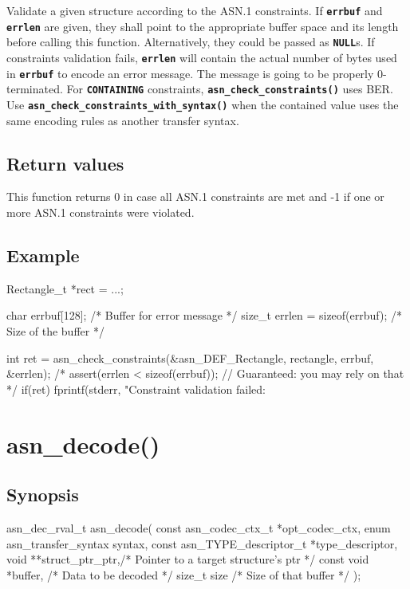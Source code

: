 \documentclass[english,oneside,12pt]{book}
\newcommand{\apisection}[2]{\clearpage\section{\label{#1}#2}}
\newcommand{\code}[1]{\texttt{\textbf{\lstinline{#1}}}}
\begin{document}
Validate a given structure according to the ASN.1 constraints.
If \code{errbuf} and \code{errlen} are given, they shall point to the
appropriate buffer space and its length before calling this function.
Alternatively, they could be passed as \code{NULL}s.
If constraints validation fails, \code{errlen} will contain the actual
number of bytes used in \code{errbuf} to encode an error message.
The message is going to be properly 0-terminated.
For \code{CONTAINING} constraints, \code{asn_check_constraints()} uses BER.
Use \code{asn_check_constraints_with_syntax()} when the contained value uses
the same encoding rules as another transfer syntax.

\subsection*{Return values}

This function returns 0 in case all ASN.1 constraints are met
and -1 if one or more ASN.1 constraints were violated.

\subsection*{Example}

\begin{codesample}[basicstyle=\scriptsize\listingfont,literate={-}{{\char45}}1]
Rectangle_t *rect = ...;

char errbuf[128];  /* Buffer for error message */
size_t errlen = sizeof(errbuf);  /* Size of the buffer */

int ret = asn_check_constraints(&asn_DEF_Rectangle, rectangle, errbuf, &errlen);
/* assert(errlen < sizeof(errbuf)); // Guaranteed: you may rely on that */
if(ret) {
    fprintf(stderr, "Constraint validation failed: %
}
\end{codesample}

\apisection{sec:asn_decode}{asn\_decode()}

\subsection*{Synopsis}
\begin{signature}
asn_dec_rval_t asn_decode(
    const asn_codec_ctx_t *opt_codec_ctx,
    enum asn_transfer_syntax syntax,
    const asn_TYPE_descriptor_t *type_descriptor,
    void **struct_ptr_ptr,/* Pointer to a target structure's ptr */
    const void *buffer,   /* Data to be decoded */
    size_t size           /* Size of that buffer */
);
\end{signature}
\end{document}
